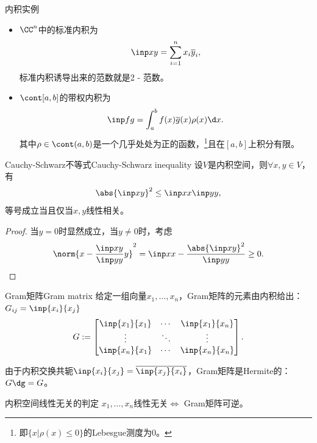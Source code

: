 \begin{example}
    {内积实例}{}
    \begin{itemize}
        \item $\CC^n$中的标准内积为
        \[
            \inp xy=\sum_{i=1}^nx_i\overline y_i,
        \]
        标准内积诱导出来的范数就是2 - 范数。
        \item $\cont[a,b]$的带权内积为 
        \[
            \inp fg=\int_a^bf(x)\overline g(x)\rho(x)\d x.
        \]
        其中$\rho\in\cont(a,b)$是一个几乎处处为正的函数，\footnote{即$\{x|\rho(x)\leq 0\}$的Lebesgue测度为0。}且在$[a,b]$上积分有限。
    \end{itemize}
\end{example}

\begin{theorem}
    {Cauchy-Schwarz不等式}{Cauchy-Schwarz inequality}
    设$V$是内积空间，则$\forall x,y\in V$，有
    \begin{equation}
        \abs{\inp xy}^2\leq\inp xx\inp yy,
    \end{equation}
    等号成立当且仅当$x,y$线性相关。
\end{theorem}

\begin{proof}
    当$y=0$时显然成立，当$y\neq 0$时，考虑
    \[
        \norm{x-\frac{\inp xy}{\inp yy}y}^2=\inp xx-\frac{\abs{\inp xy}^2}{\inp yy}\geq 0.
        \qedhere
    \]
\end{proof}

\begin{definition}
    {Gram矩阵}{Gram matrix}
    给定一组向量$x_1,\ldots,x_n$，Gram矩阵的元素由内积给出：$G_{ij}=\inp{x_i}{x_j}$
    \begin{equation}
        G:=\begin{bmatrix}
            \inp{x_1}{x_1}&\cdots&\inp{x_1}{x_n}\\
            \vdots&\ddots&\vdots\\
            \inp{x_n}{x_1}&\cdots&\inp{x_n}{x_n}
        \end{bmatrix}.
    \end{equation}
\end{definition}

\begin{corollary}
    由于内积交换共轭$\inp{x_i}{x_j}=\overline{\inp{x_j}{x_i}}$，Gram矩阵是Hermite的：$G\dg=G$。
\end{corollary}

\begin{theorem}
    {内积空间线性无关的判定}{}
    $x_1,\ldots,x_n$线性无关$\iff$ Gram矩阵可逆。
\end{theorem}


